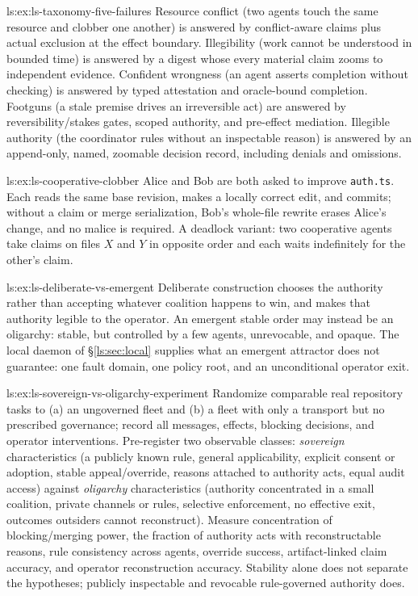 \begin{pdSolution}{ls:ex:ls-taxonomy-five-failures}
Resource conflict (two agents touch the same resource and clobber one another) is answered by conflict-aware claims plus actual exclusion at the effect boundary. Illegibility (work cannot be understood in bounded time) is answered by a digest whose every material claim zooms to independent evidence. Confident wrongness (an agent asserts completion without checking) is answered by typed attestation and oracle-bound completion. Footguns (a stale premise drives an irreversible act) are answered by reversibility/stakes gates, scoped authority, and pre-effect mediation. Illegible authority (the coordinator rules without an inspectable reason) is answered by an append-only, named, zoomable decision record, including denials and omissions.
\end{pdSolution}
\begin{pdSolution}{ls:ex:ls-cooperative-clobber}
Alice and Bob are both asked to improve \texttt{auth.ts}. Each reads the same base revision, makes a locally correct edit, and commits; without a claim or merge serialization, Bob's whole-file rewrite erases Alice's change, and no malice is required. A deadlock variant: two cooperative agents take claims on files $X$ and $Y$ in opposite order and each waits indefinitely for the other's claim.
\end{pdSolution}
\begin{pdSolution}{ls:ex:ls-deliberate-vs-emergent}
Deliberate construction chooses the authority rather than accepting whatever coalition happens to win, and makes that authority legible to the operator. An emergent stable order may instead be an oligarchy: stable, but controlled by a few agents, unrevocable, and opaque. The local daemon of \S\ref{ls:sec:local} supplies what an emergent attractor does not guarantee: one fault domain, one policy root, and an unconditional operator exit.
\end{pdSolution}
\begin{pdSolution}{ls:ex:ls-sovereign-vs-oligarchy-experiment}
Randomize comparable real repository tasks to (a) an ungoverned fleet and (b) a fleet with only a transport but no prescribed governance; record all messages, effects, blocking decisions, and operator interventions. Pre-register two observable classes: \emph{sovereign} characteristics (a publicly known rule, general applicability, explicit consent or adoption, stable appeal/override, reasons attached to authority acts, equal audit access) against \emph{oligarchy} characteristics (authority concentrated in a small coalition, private channels or rules, selective enforcement, no effective exit, outcomes outsiders cannot reconstruct). Measure concentration of blocking/merging power, the fraction of authority acts with reconstructable reasons, rule consistency across agents, override success, artifact-linked claim accuracy, and operator reconstruction accuracy. Stability alone does not separate the hypotheses; publicly inspectable and revocable rule-governed authority does.
\end{pdSolution}
